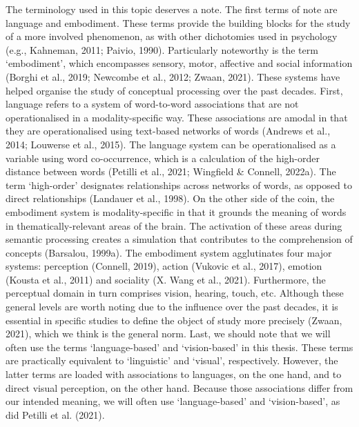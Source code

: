 \documentclass[
  12pt,
  man,floatsintext]{apa7}
\begin{document}
The terminology used in this topic deserves a note. The first terms of note are language and embodiment. These terms provide the building blocks for the study of a more involved phenomenon, as with other dichotomies used in psychology (e.g., Kahneman, 2011; Paivio, 1990). Particularly noteworthy is the term `embodiment', which encompasses sensory, motor, affective and social information (Borghi et al., 2019; Newcombe et al., 2012; Zwaan, 2021). These systems have helped organise the study of conceptual processing over the past decades. First, language refers to a system of word-to-word associations that are not operationalised in a modality-specific way. These associations are amodal in that they are operationalised using text-based networks of words (Andrews et al., 2014; Louwerse et al., 2015). The language system can be operationalised as a variable using word co-occurrence, which is a calculation of the high-order distance between words (Petilli et al., 2021; Wingfield \& Connell, 2022a). The term `high-order' designates relationships across networks of words, as opposed to direct relationships (Landauer et al., 1998). On the other side of the coin, the embodiment system is modality-specific in that it grounds the meaning of words in thematically-relevant areas of the brain. The activation of these areas during semantic processing creates a simulation that contributes to the comprehension of concepts (Barsalou, 1999a). The embodiment system agglutinates four major systems: perception (Connell, 2019), action (Vukovic et al., 2017), emotion (Kousta et al., 2011) and sociality (X. Wang et al., 2021). Furthermore, the perceptual domain in turn comprises vision, hearing, touch, etc. Although these general levels are worth noting due to the influence over the past decades, it is essential in specific studies to define the object of study more precisely (Zwaan, 2021), which we think is the general norm. Last, we should note that we will often use the terms `language-based' and `vision-based' in this thesis. These terms are practically equivalent to `linguistic' and `visual', respectively. However, the latter terms are loaded with associations to languages, on the one hand, and to direct visual perception, on the other hand. Because those associations differ from our intended meaning, we will often use `language-based' and `vision-based', as did Petilli et al. (2021).
\end{document}
